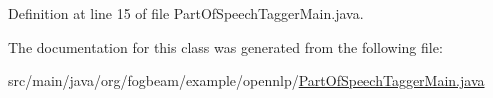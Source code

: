 Definition at line 15 of file Part\+Of\+Speech\+Tagger\+Main.\+java.



The documentation for this class was generated from the following file\+:\begin{DoxyCompactItemize}
\item 
src/main/java/org/fogbeam/example/opennlp/\hyperlink{_part_of_speech_tagger_main_8java}{Part\+Of\+Speech\+Tagger\+Main.\+java}\end{DoxyCompactItemize}
